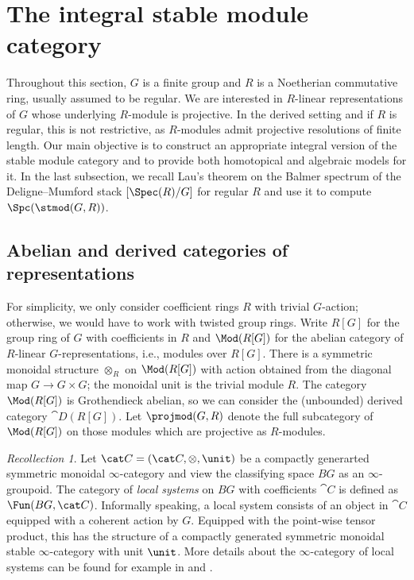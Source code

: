 \documentclass{amsart}%
\numberwithin{equation}{section}%
\theoremstyle{remark}
\newtheorem{Rec}[equation]{Recollection}
\begin{document}
\section{The integral stable module category}

Throughout this section, $G$ is a finite group and $R$ is a Noetherian commutative ring, usually assumed to be regular. We are interested in $R$-linear representations of $G$ whose underlying $R$-module is projective. In the derived setting and if $R$ is regular, this is not restrictive, as $R$-modules admit projective resolutions of finite length. Our main objective is to construct an appropriate integral version of the stable module category and to provide both homotopical and algebraic models for it. In the last subsection, we recall Lau's theorem on the Balmer spectrum of the Deligne--Mumford stack $[\Spec(R)/G]$ for regular $R$ and use it to compute $\Spc(\stmod(G,R))$. 


\subsection{Abelian and derived categories of representations}

For simplicity, we only consider coefficient rings $R$ with trivial $G$-action; otherwise, we would have to work with twisted group rings. Write $R[G]$ for the group ring of $G$ with coefficients in $R$ and $\Mod(R[G])$ for the abelian category of $R$-linear $G$-representations, i.e., modules over $R[G]$. There is a symmetric monoidal structure $\otimes_R$ on $\Mod(R[G])$ with action obtained from the diagonal map $G \to G \times G$; the monoidal unit is the trivial module $R$. The category $\Mod(R[G])$ is Grothendieck abelian, so we can consider the (unbounded) derived category $\cat D(R[G])$. Let $\projmod(G,R)$ denote the full subcategory of $\Mod(R[G])$ on those modules which are projective as $R$-modules.

\begin{Rec}\label{rec:localsystems}
Let $\cat C = (\cat C,\otimes, \unit)$ be a compactly generarted symmetric monoidal $\infty$-category and view the classifying space $BG$ as an $\infty$-groupoid. The category of \emph{local systems} on $BG$ with coefficients $\cat C$ is defined as $\Fun(BG,\cat C)$. Informally speaking, a local system consists of an object in $\cat C$ equipped with a coherent action by $G$. Equipped with the point-wise tensor product, this has the structure of a compactly generated symmetric monoidal stable $\infty$-category with unit $\unit$. More details about the $\infty$-category of local systems can be found for example in \cite[\S4.4]{HopkinsLurie13pp} and \cite[\S3]{HALurie}.
\end{Rec}
\end{document}
